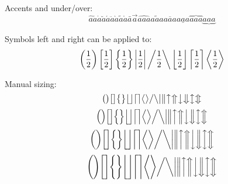 Accents and under/over:
\begin{equation}
\hat{a} \check{a} \dot{a} \breve{a} \acute{a} \ddot{a} \grave{a} \tilde{a} \mathring{a} \bar{a} \vec{a} \widehat{aaa} \widetilde{aaa} \overline{aaa} \underline{aaa} \overbrace{aaa} \underbrace{aaa}
\end{equation}

Symbols left and right can be applied to:
\begin{equation}
\left( \frac{1}{2} \right) \left[ \frac{1}{2} \right] \left\{ \frac{1}{2} \right\} \left| \frac{1}{2} \right| \left/ \frac{1}{2} \right\backslash \left\lfloor \frac{1}{2} \right\rfloor \left\lceil \frac{1}{2} \right\rceil \left\langle \frac{1}{2} \right\rangle 
\end{equation}

Manual sizing:
\begin{equation}
\big( \big) \big[ \big] \big\{ \big\} \big\lfloor \big\rfloor \big\lceil \big\rceil \big\langle \big\rangle 
\big/ \big\backslash \big| \big\| \big\uparrow \big\Uparrow \big\downarrow \big\Downarrow \big\updownarrow \big\Updownarrow
\end{equation}
\begin{equation}
\Big( \Big) \Big[ \Big] \Big\{ \Big\} \Big\lfloor \Big\rfloor \Big\lceil \Big\rceil \Big\langle \Big\rangle 
\Big/ \Big\backslash \Big| \Big\| \Big\uparrow \Big\Uparrow \Big\downarrow \Big\Downarrow \Big\updownarrow \Big\Updownarrow
\end{equation}
\begin{equation}
\bigg( \bigg) \bigg[ \bigg] \bigg\{ \bigg\} \bigg\lfloor \bigg\rfloor \bigg\lceil \bigg\rceil \bigg\langle \bigg\rangle 
\bigg/ \bigg\backslash \bigg| \bigg\| \bigg\uparrow \bigg\Uparrow \bigg\downarrow \bigg\Downarrow \bigg\updownarrow \bigg\Updownarrow
\end{equation}
\begin{equation}
\Bigg( \Bigg) \Bigg[ \Bigg] \Bigg\{ \Bigg\} \Bigg\lfloor \Bigg\rfloor \Bigg\lceil \Bigg\rceil \Bigg\langle \Bigg\rangle 
\bigg/ \bigg\backslash \bigg| \bigg\| \bigg\uparrow \bigg\Uparrow \bigg\downarrow \bigg\Downarrow \bigg\updownarrow \bigg\Updownarrow
\end{equation}

